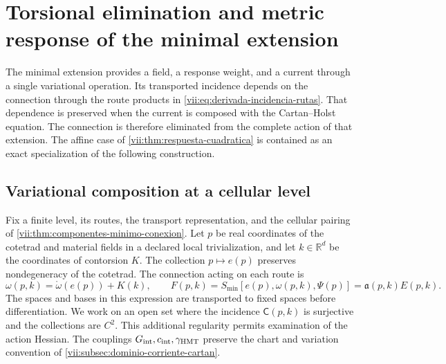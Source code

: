 
\section{Torsional elimination and metric response of the minimal extension}
\label{vii:sec:eliminacion-torsional-no-lineal}

The minimal extension provides a field, a response weight, and a
current through a single variational operation. Its transported
incidence depends on the connection through the route products in
\eqref{vii:eq:derivada-incidencia-rutas}. That dependence is preserved when
the current is composed with the Cartan--Holst equation. The connection
is therefore eliminated from the complete action of that
extension. The affine case of
\ref{vii:thm:respuesta-cuadratica} is contained as an exact
specialization of the following construction.

\subsection{Variational composition at a cellular level}
\label{vii:subsec:composicion-torsional-celular}

Fix a finite level, its routes, the transport representation, and
the cellular pairing of
\ref{vii:thm:componentes-minimo-conexion}. Let \(p\) be real
coordinates of the cotetrad and material fields in a declared local
trivialization, and let \(k\in\mathbb R^d\) be the coordinates of
contorsion \(K\). The collection \(p\mapsto e(p)\) preserves
nondegeneracy of the cotetrad. The connection acting on each route is
\begin{equation}
 \omega(p,k)=\mathring\omega(e(p))+K(k),\qquad
 F(p,k)=S_{\min}[e(p),\omega(p,k),\Psi(p)]
       =\mathfrak a(p,k)E(p,k).
 \label{vii:eq:accion-minima-en-contorsion}
\end{equation}
The spaces and bases in this expression are transported to fixed
spaces before differentiation. We work on an open set where the incidence
\(\mathsf C(p,k)\) is surjective and the collections are \(C^2\).
This additional regularity permits examination of the action Hessian.
The couplings \(G_{\rm int},c_{\rm int},\gamma_{\rm HMT}\)
preserve the chart and variation convention of
\ref{vii:subsec:dominio-corriente-cartan}.

